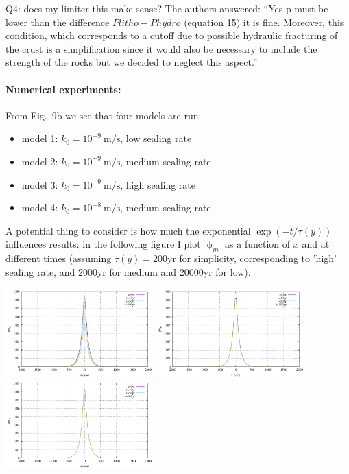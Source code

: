 {\color{red} Q4: does my limiter this make sense?}
The authors answered: ``Yes p must be lower than the difference 
$Plitho - Phydro$ (equation 15) it is fine.
Moreover, this condition, which corresponds to a cutoff due to possible 
hydraulic fracturing of the crust is a simplification since it would also 
be necessary to include the strength of the rocks but we decided to neglect this aspect.''



\paragraph{Numerical experiments:} From Fig.~9b we see that four models are run:
\begin{itemize}
\item model 1: $k_0=10^{-9}~\si{\meter\per\second}$, low sealing rate
\item model 2: $k_0=10^{-9}~\si{\meter\per\second}$, medium sealing rate
\item model 3: $k_0=10^{-9}~\si{\meter\per\second}$, high sealing rate
\item model 4: $k_0=10^{-8}~\si{\meter\per\second}$, medium sealing rate
\end{itemize}

A potential thing to consider is how much the exponential $\exp(-t/\tau(y))$
influences results: in the following figure I plot $\upphi_m$ as a function of 
$x$ and at different times (assuming $\tau(y)=200$yr for simplicity, corresponding
to 'high' sealing rate, and 2000yr for medium and 20000yr for low).

\begin{center}
\includegraphics[width=5.7cm]{python_codes/fieldstone_126/images/phi200}
\includegraphics[width=5.7cm]{python_codes/fieldstone_126/images/phi2000}
\includegraphics[width=5.7cm]{python_codes/fieldstone_126/images/phi20000}
\end{center}

